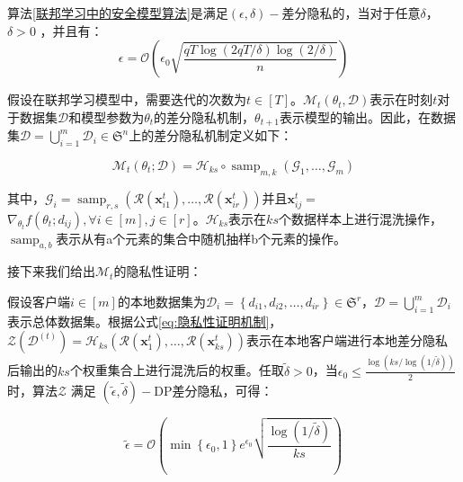 \begin{theorem}\label{隐私性证明}
算法\ref{联邦学习中的安全模型算法}是满足$(\epsilon, \delta)-$差分隐私的，当对于任意$\delta$，$\delta>0$ ，并且有：
$$
\epsilon=\mathcal{O}\left(\epsilon_{0} \sqrt{\frac{q T \log (2 q T / \delta) \log (2 / \delta)}{n}}\right)
$$
\end{theorem}

假设在联邦学习模型中，需要迭代的次数为$t \in[T]$。$\mathcal{M}_{t}\left(\theta_{t}, \mathcal{D}\right)$表示在时刻$t$对于数据集$\mathcal{D}$和模型参数为$\theta_{t}$的差分隐私机制，$\theta_{t+1}$表示模型的输出。因此，在数据集$\mathcal{D}=\bigcup_{i=1}^{m} \mathcal{D}_{i} \in \mathfrak{S}^{n}$上的差分隐私机制定义如下：

\begin{equation}\label{eq:隐私性证明机制}
\mathcal{M}_{t}\left(\theta_{t} ; \mathcal{D}\right)=\mathcal{H}_{k s} \circ \operatorname{samp}_{m, k}\left(\mathcal{G}_{1}, \ldots, \mathcal{G}_{m}\right)
\end{equation}

其中，$\mathcal{G}_{i}=\operatorname{samp}_{r, s}\left(\mathcal{R}\left(\boldsymbol{x}_{i 1}^{t}\right), \ldots, \mathcal{R}\left(\boldsymbol{x}_{i r}^{t}\right)\right)$并且$\boldsymbol{x}_{i j}^{t}=$$\nabla_{\theta_{t}} f\left(\theta_{t} ; d_{i j}\right), \forall i \in[m], j \in[r]$。$\mathcal{H}_{k s}$表示在$k s$个数据样本上进行混洗操作， $\operatorname{samp}_{a, b}$表示从有a个元素的集合中随机抽样b个元素的操作。

接下来我们给出$\mathcal{M}_{t}$的隐私性证明：

假设客户端$i \in[m]$的本地数据集为$\mathcal{D}_{i}=\left\{d_{i 1}, d_{i 2}, \ldots, d_{i r}\right\} \in \mathfrak{S}^{r}$，$\mathcal{D}=\bigcup_{i=1}^{m} \mathcal{D}_{i}$表示总体数据集。根据公式\ref{eq:隐私性证明机制}，$\mathcal{Z}\left(\mathcal{D}^{(t)}\right)=\mathcal{H}_{k s}\left(\mathcal{R}\left(\boldsymbol{x}_{1}^{t}\right), \ldots, \mathcal{R}\left(\boldsymbol{x}_{k s}^{t}\right)\right)$表示在本地客户端进行本地差分隐私后输出的$ks$个权重集合上进行混洗后的权重。任取$\tilde{\delta}>0$，当$\epsilon_{0} \leq \frac{\log (k s / \log (1 / \tilde{\delta}))}{2}$时，算法$\mathcal{Z}$ 满足 $(\tilde{\epsilon}, \tilde{\delta})-\mathrm{DP}$差分隐私，可得：

\begin{equation}\label{eq:隐私性证明机制2}
\tilde{\epsilon}=\mathcal{O}\left(\min \left\{\epsilon_{0}, 1\right\} e^{\epsilon_{0}} \sqrt{\frac{\log (1 / \tilde{\delta})}{k s}}\right)
\end{equation}


